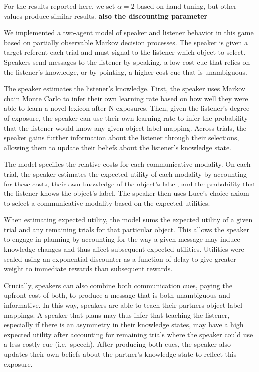 \documentclass[10pt, letterpaper]{article}
\begin{document}
For the results reported here, we set \(\alpha = 2\) based on
hand-tuning, but other values produce similar results. \textbf{also the
discounting parameter}

We implemented a two-agent model of speaker and listener behavior in
this game based on partially observable Markov decision processes. The
speaker is given a target referent each trial and must signal to the
listener which object to select. Speakers send messages to the listener
by speaking, a low cost cue that relies on the listener's knowledge, or
by pointing, a higher cost cue that is unambiguous.

The speaker estimates the listener's knowledge. First, the speaker uses
Markov chain Monte Carlo to infer their own learning rate based on how
well they were able to learn a novel lexicon after N exposures. Then,
given the listener's degree of exposure, the speaker can use their own
learning rate to infer the probability that the listener would know any
given object-label mapping. Across trials, the speaker gains further
information about the listener through their selections, allowing them
to update their beliefs about the listener's knowledge state.

The model specifies the relative costs for each communicative modality.
On each trial, the speaker estimates the expected utility of each
modality by accounting for these costs, their own knowledge of the
object's label, and the probability that the listener knows the object's
label. The speaker then uses Luce's choice axiom to select a
communicative modality based on the expected utilities.

When estimating expected utility, the model sums the expected utility of
a given trial and any remaining trials for that particular object. This
allows the speaker to engage in planning by accounting for the way a
given message may induce knowledge changes and thus affect subsequent
expected utilities. Utilities were scaled using an exponential
discounter as a function of delay to give greater weight to immediate
rewards than subsequent rewards.

Crucially, speakers can also combine both communication cues, paying the
upfront cost of both, to produce a message that is both unambiguous and
informative. In this way, speakers are able to teach their partners
object-label mappings. A speaker that plans may thus infer that teaching
the listener, especially if there is an asymmetry in their knowledge
states, may have a high expected utility after accounting for remaining
trials where the speaker could use a less costly cue (i.e.~speech).
After producing both cues, the speaker also updates their own beliefs
about the partner's knowledge state to reflect this exposure.
\end{document}
